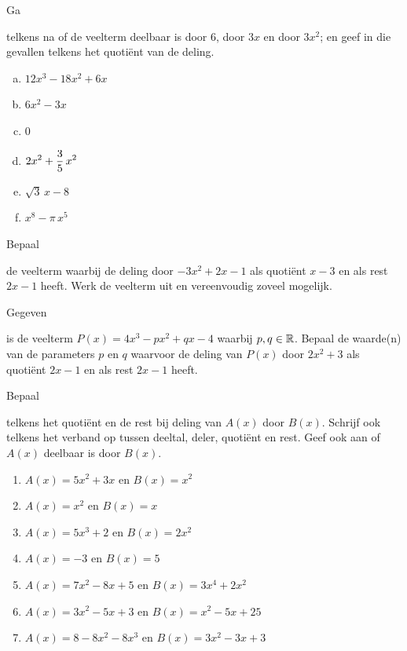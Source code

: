 \documentclass{ximera}
\begin{document}
\begin{Oefening}\setcounter{enumi}{2} 
\hypertarget{oef2.2}{Ga} telkens na of de veelterm deelbaar is door $6$, door $3x$ en door $3x^2$; en geef in die gevallen telkens het quoti\"ent van de deling.
\begin{multicols}{2}
\begin{enumerate}[(a)]
\item
$12x^3-18x^2+6x$
\item
$6x^2-3x$
\item
$0$
\item
$\displaystyle 2x^2+\frac{3}{5}\,x^2$
\item
$\sqrt{3}\,x-8$
\item
$x^8-\pi\,x^5$
\end{enumerate}
\end{multicols}
\end{Oefening}

\begin{Oefening}\setcounter{enumi}{3} 
\hypertarget{oef2.3}{Bepaal} de veelterm waarbij de deling door $-3x^2+2x-1$ als quoti\"ent $x-3$ en als rest $2x-1$ heeft. Werk de veelterm uit en vereenvoudig zoveel mogelijk.
\end{Oefening}

\begin{Oefening}\setcounter{enumi}{4}  
\hypertarget{oef2.4}{Gegeven} is de veelterm $P(x) = 4x^3 - px^2 + qx - 4$ waarbij $p,q \in \mathbb{R}$. Bepaal de waarde(n) van de parameters $p$ en $q$ waarvoor de deling van $P(x)$ door $2x^2+3$ als quoti\"ent $2x-1$ en als rest $2x-1$ heeft. 
\end{Oefening}

\begin{Oefening}\setcounter{enumi}{5} 
\hypertarget{oef2.5}{Bepaal} telkens het quoti\"ent en de rest bij deling van $A(x)$ door $B(x)$. Schrijf ook telkens het verband op tussen deeltal, deler, quoti\"ent en rest. Geef ook aan of $A(x)$ deelbaar is door $B(x)$.
\begin{enumerate}
\item
$A(x) = 5x^2 + 3x$ \quad en \quad $B(x) = x^2$
\item
$A(x) = x^2$ \quad en \quad $B(x) = x$
\item
$A(x) = 5x^3+2$ \quad en \quad $B(x) = 2x^2$
\item
$A(x) = -3$ \quad en \quad $B(x) = 5$
\item
$A(x) = 7x^2-8x+5$ \quad en \quad $B(x) = 3x^4+2x^2$
\item
$A(x) = 3x^2 - 5x + 3$ \quad en \quad $B(x) = x^2 - 5x + 25$ 
\item
$A(x) = 8-8x^2-8x^3$ \quad en \quad $B(x) = 3x^2 - 3x + 3$ 
\end{enumerate}
\end{Oefening}
\end{document}
